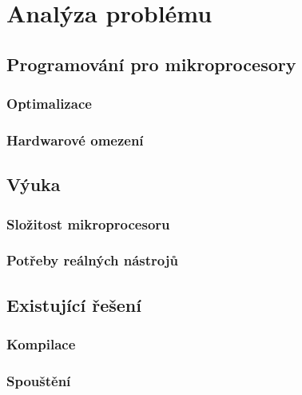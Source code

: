 \chapter{Analýza problému}

\blind[2]

\section{Programování pro mikroprocesory}

\blind[3]

\subsection{Optimalizace}

\blind[2]

\subsection{Hardwarové omezení}

\blind[3]

\section{Výuka}

\blind[1]

\subsection{Složitost mikroprocesoru}

\blind[2]

\subsection{Potřeby reálných nástrojů}

\blind[2]

\section{Existující řešení}

\blind[1]

\subsection{Kompilace}

\blind[4]

\subsection{Spouštění}


